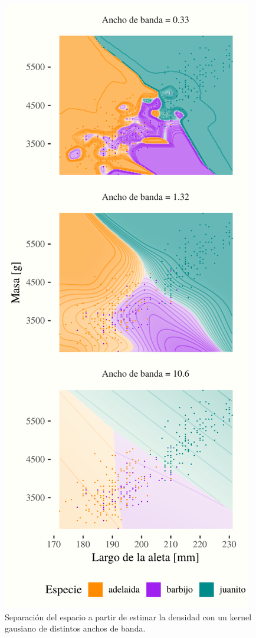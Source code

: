 \documentclass[]{tufte-handout}
\begin{document}
\begin{figure}
\includegraphics{TP-Labo-2_files/figure-latex/densidad-2} \caption[Separación del espacio a partir de estimar la densidad con un kernel gausiano de distintos anchos de banda]{Separación del espacio a partir de estimar la densidad con un kernel gausiano de distintos anchos de banda.}\label{fig:densidad}
\end{figure}
\end{document}
